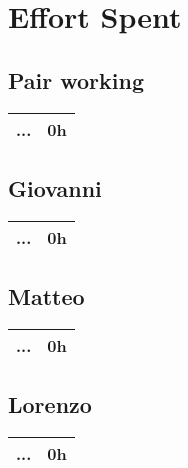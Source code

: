 \section{Effort Spent}
\subsection*{Pair working}
\begin{table}[H]
    \begin{tabular}{lr}
        \toprule
        \textbf{...} & \textbf{0h} \\
        \bottomrule
    \end{tabular}
\end{table}

\subsection*{Giovanni}
\begin{table}[H]
    \begin{tabular}{lr}
        \toprule
        \textbf{...} & \textbf{0h} \\
        \bottomrule
    \end{tabular}
\end{table}

\subsection*{Matteo}
\begin{table}[H]
    \begin{tabular}{lr}
        \toprule
        \textbf{...} & \textbf{0h} \\
        \bottomrule
    \end{tabular}
\end{table}

\subsection*{Lorenzo}
\begin{table}[H]
    \begin{tabular}{lr}
        \toprule
        \textbf{...} & \textbf{0h} \\
        \bottomrule
    \end{tabular}
\end{table}
